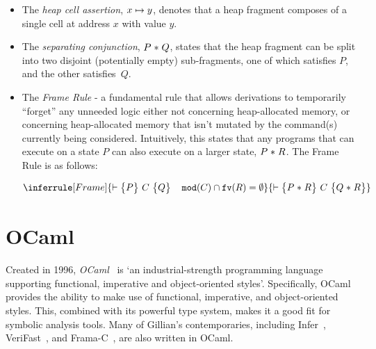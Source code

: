 \begin{itemize}
  \item The \textit{heap cell assertion}, $x \mapsto y$, denotes that a heap
  fragment composes of a single cell at address $x$ with value $y$.

  \item The \textit{separating conjunction}, $P \mathrel{*} Q$, states that the heap
  fragment can be split into two disjoint (potentially empty) sub-fragments,
  one of which satisfies $P$, and the other satisfies~$Q$.

  \item The \textit{Frame Rule} - a fundamental rule that allows derivations to
  temporarily ``forget'' any unneeded logic either not concerning
  heap-allocated memory, or concerning heap-allocated memory that isn't mutated
  by the command(s) currently being considered. Intuitively, this states that
  any programs that can execute on a state $P$ can also execute on a larger
  state, $P \mathrel{*} R$. The Frame Rule is as follows:

  $$
    \inferrule[Frame]{
      \triple{P}{C}{Q} \quad \mathtt{mod}(C) \cap \mathtt{fv}(R) =
      \emptyset}{\triple{P \lstar R}{C}{Q \lstar R}
    }
  $$
\end{itemize}


\section{OCaml}

Created in 1996, \textit{OCaml}~\cite{ocaml} is `an industrial-strength
programming language supporting functional, imperative and object-oriented
styles'. Specifically, OCaml provides the ability to make use of functional,
imperative, and object-oriented styles. This, combined with its powerful type
system, makes it a good fit for symbolic analysis tools. Many of Gillian's
contemporaries, including Infer~\cite{infer}, VeriFast~\cite{verifast-paper,
verifast-repo}, and Frama-C~\cite{frama-c}, are also written in OCaml.

